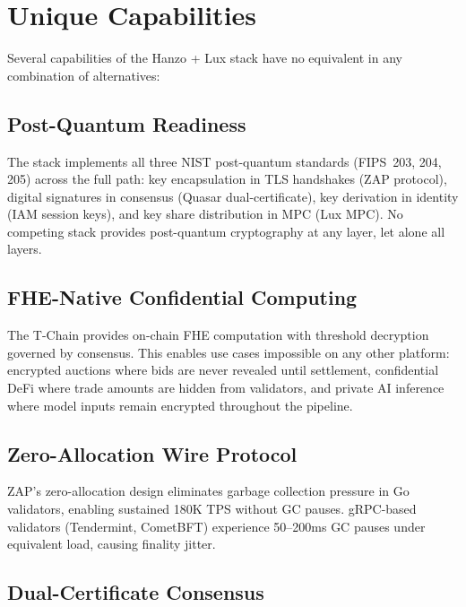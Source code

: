 \section{Unique Capabilities}

\label{sec:unique}

Several capabilities of the Hanzo + Lux stack have no equivalent in any combination of alternatives:

\subsection{Post-Quantum Readiness}

The stack implements all three NIST post-quantum standards (FIPS~203, 204, 205) across the full path: key encapsulation in TLS handshakes (ZAP protocol), digital signatures in consensus (Quasar dual-certificate), key derivation in identity (IAM session keys), and key share distribution in MPC (Lux MPC). No competing stack provides post-quantum cryptography at any layer, let alone all layers.

\subsection{FHE-Native Confidential Computing}

The T-Chain provides on-chain FHE computation with threshold decryption governed by consensus. This enables use cases impossible on any other platform: encrypted auctions where bids are never revealed until settlement, confidential DeFi where trade amounts are hidden from validators, and private AI inference where model inputs remain encrypted throughout the pipeline.

\subsection{Zero-Allocation Wire Protocol}

ZAP's zero-allocation design eliminates garbage collection pressure in Go validators, enabling sustained 180K TPS without GC pauses. gRPC-based validators (Tendermint, CometBFT) experience 50--200ms GC pauses under equivalent load, causing finality jitter.

\subsection{Dual-Certificate Consensus}

